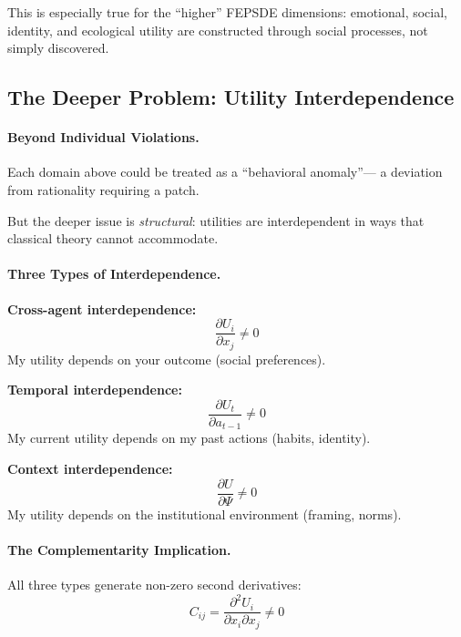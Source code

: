 \documentclass[12pt,a4paper]{article}
\begin{document}
This is especially true for the ``higher'' FEPSDE dimensions:
emotional, social, identity, and ecological utility
are constructed through social processes, not simply discovered.

\subsection{The Deeper Problem: Utility Interdependence}

\paragraph{Beyond Individual Violations.}
Each domain above could be treated as a ``behavioral anomaly''---
a deviation from rationality requiring a patch.

But the deeper issue is \emph{structural}:
utilities are interdependent in ways that classical theory cannot accommodate.

\paragraph{Three Types of Interdependence.}

\textbf{Cross-agent interdependence:}
\begin{equation}
  \frac{\partial U_i}{\partial x_j} \neq 0
\end{equation}
My utility depends on your outcome (social preferences).

\textbf{Temporal interdependence:}
\begin{equation}
  \frac{\partial U_t}{\partial a_{t-1}} \neq 0
\end{equation}
My current utility depends on my past actions (habits, identity).

\textbf{Context interdependence:}
\begin{equation}
  \frac{\partial U}{\partial \Psi} \neq 0
\end{equation}
My utility depends on the institutional environment (framing, norms).

\paragraph{The Complementarity Implication.}
All three types generate non-zero second derivatives:
\begin{equation}
  C_{ij} = \frac{\partial^2 U_i}{\partial x_i \partial x_j} \neq 0
\end{equation}
\end{document}
